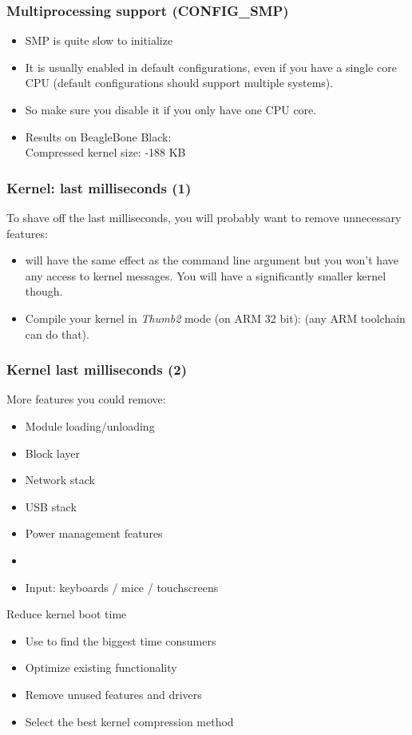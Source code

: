 \begin{frame}
  \frametitle{Multiprocessing support (CONFIG\_SMP)}
  \begin{itemize}
          \item SMP is quite slow to initialize
          \item It is usually enabled in default configurations, even if
                you have a single core CPU (default configurations
                should support multiple systems).
          \item So make sure you disable it if you only have one CPU
                core.
          \item Results on BeagleBone Black:\\
                Compressed kernel size: -188 KB
  \end{itemize}
\end{frame}


\begin{frame}
\frametitle{Kernel: last milliseconds (1)}
To shave off the last milliseconds, you will probably want to remove
unnecessary features:
\begin{itemize}
        \item {} will have the same effect as the
               command line argument but you won't have
              any access to kernel messages. You will have a
              significantly smaller kernel though.
        \item Compile your kernel in {\em Thumb2} mode (on ARM 32 bit):
               (any ARM toolchain can do
              that).
\end{itemize}
\end{frame}

\begin{frame}
\frametitle{Kernel last milliseconds (2)}
More features you could remove:
\begin{itemize}
        \item Module loading/unloading
        \item Block layer
        \item Network stack
        \item USB stack
        \item Power management features
        \item {}
        \item Input: keyboards / mice / touchscreens
\end{itemize}
\end{frame}

\setuplabframe
{Reduce kernel boot time}
{
\begin{itemize}
\item Use  to find the biggest
      time consumers
\item Optimize existing functionality
\item Remove unused features and drivers
\item Select the best kernel compression method
\end{itemize}
}

